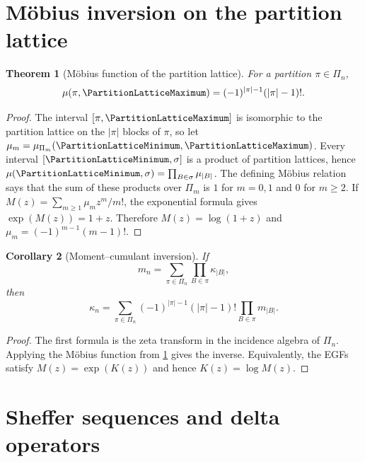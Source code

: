 \documentclass[11pt,a4paper,oneside,openany]{book}
\newtheorem{theorem}{Theorem}[chapter]
\newtheorem{corollary}[theorem]{Corollary}
\theoremstyle{definition}
\theoremstyle{remark}
\begin{document}
\section{M\"obius inversion on the partition lattice}

\begin{theorem}[M\"obius function of the partition lattice]
\label{unif:thm-partition-mobius}
For a partition $\pi\in\Pi_n$,
\begin{equation}\label{unif:eq-partition-mobius}
 \mu(\pi,\PartitionLatticeMaximum)=(-1)^{|\pi|-1}(|\pi|-1)!.
\end{equation}
\end{theorem}
\begin{proof}
The interval $[\pi,\PartitionLatticeMaximum]$ is isomorphic to the partition lattice on the
$|\pi|$ blocks of $\pi$, so let
$\mu_m=\mu_{\Pi_m}(\PartitionLatticeMinimum,\PartitionLatticeMaximum)$. Every interval
$[\PartitionLatticeMinimum,\sigma]$ is a product of partition lattices, hence
$\mu(\PartitionLatticeMinimum,\sigma)=\prod_{B\in\sigma}\mu_{|B|}$. The defining M\"obius
relation says that the sum of these products over $\Pi_m$ is $1$ for
$m=0,1$ and $0$ for $m\ge2$. If
$M(z)=\sum_{m\ge1}\mu_mz^m/m!$, the exponential formula gives
$\exp(M(z))=1+z$. Therefore $M(z)=\log(1+z)$ and
$\mu_m=(-1)^{m-1}(m-1)!$.
\end{proof}

\begin{corollary}[Moment--cumulant inversion]
If
\begin{equation}\label{unif:eq-moment-partition}
 m_n=\sum_{\pi\in\Pi_n}\prod_{B\in\pi}\kappa_{|B|},
\end{equation}
then
\begin{equation}\label{unif:eq-cumulant-partition}
 \kappa_n=\sum_{\pi\in\Pi_n}(-1)^{|\pi|-1}(|\pi|-1)!
 \prod_{B\in\pi}m_{|B|}.
\end{equation}
\end{corollary}
\begin{proof}
The first formula is the zeta transform in the incidence algebra of $\Pi_n$.
Applying the M\"obius function from
\cref{unif:thm-partition-mobius} gives the inverse. Equivalently, the EGFs
satisfy $M(z)=\exp(K(z))$ and hence $K(z)=\log M(z)$.
\end{proof}

\section{Sheffer sequences and delta operators}
\end{document}
